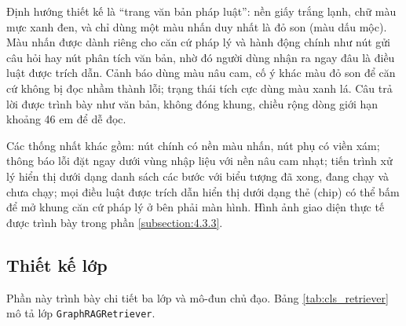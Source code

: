 \documentclass[../DoAn.tex]{subfiles}
\begin{document}
Định hướng thiết kế là ``trang văn bản pháp luật'': nền giấy trắng lạnh, chữ màu mực xanh đen, và chỉ dùng một màu nhấn duy nhất là đỏ son (màu dấu mộc). Màu nhấn được dành riêng cho căn cứ pháp lý và hành động chính như nút gửi câu hỏi hay nút phân tích văn bản, nhờ đó người dùng nhận ra ngay đâu là điều luật được trích dẫn. Cảnh báo dùng màu nâu cam, cố ý khác màu đỏ son để căn cứ không bị đọc nhầm thành lỗi; trạng thái tích cực dùng màu xanh lá. Câu trả lời được trình bày như văn bản, không đóng khung, chiều rộng dòng giới hạn khoảng 46 em để dễ đọc.

Các thống nhất khác gồm: nút chính có nền màu nhấn, nút phụ có viền xám; thông báo lỗi đặt ngay dưới vùng nhập liệu với nền nâu cam nhạt; tiến trình xử lý hiển thị dưới dạng danh sách các bước với biểu tượng đã xong, đang chạy và chưa chạy; mọi điều luật được trích dẫn hiển thị dưới dạng thẻ (chip) có thể bấm để mở khung căn cứ pháp lý ở bên phải màn hình. Hình ảnh giao diện thực tế được trình bày trong phần \ref{subsection:4.3.3}.

\subsection{Thiết kế lớp}
Phần này trình bày chi tiết ba lớp và mô-đun chủ đạo. Bảng \ref{tab:cls_retriever} mô tả lớp \texttt{GraphRAGRetriever}.
\end{document}
